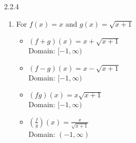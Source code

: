\begin{Answer}{2.2.4}
\begin{enumerate}
\begin{multicols}{2}
			\begin{itemize}

				\item $(fg)(x) = 1$ \\
				Domain: $(-\infty,1) \cup (1, \infty)$

				\vfill

				\columnbreak

				\item $\left(\frac{f}{g}\right)(x) =x^2-2x+1$ \\
				Domain: $(-\infty,1) \cup (1, \infty)$


			\end{itemize}

		\end{multicols}


		\item For   $f(x) =x$ and $g(x) = \sqrt{x+1}$

		\begin{multicols}{2}

			\begin{itemize}

				\item $(f+g)(x) = x+\sqrt{x+1}$ \\
				Domain: $[-1,\infty)$

				\vfill

				\columnbreak

				\item $(f-g)(x) = x-\sqrt{x+1}$ \\
				Domain: $[-1,\infty)$


			\end{itemize}

		\end{multicols}

		\begin{multicols}{2}

			\begin{itemize}

				\item $(fg)(x) = x\sqrt{x+1}$ \\
				Domain: $[-1,\infty)$

				\vfill

				\columnbreak

				\item $\left(\frac{f}{g}\right)(x) =\frac{x}{\sqrt{x+1}}$ \\
				Domain: $(-1,\infty)$


			\end{itemize}


\end{multicols}
\end{enumerate}
\end{Answer}
